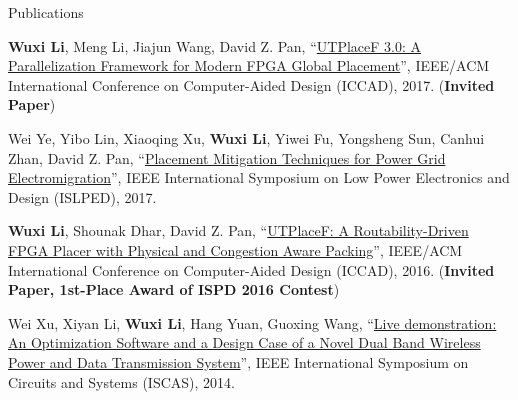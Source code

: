 \begin{rSection}{Publications}
\begin{description}[font=\normalfont]
\item[{[C4]}]{
    \textbf{Wuxi Li}, Meng Li, Jiajun Wang, David Z. Pan,
    ``\href{https://ieeexplore.ieee.org/abstract/document/8203879/}{UTPlaceF 3.0: A Parallelization Framework for Modern FPGA Global Placement}'',
    IEEE/ACM International Conference on Computer-Aided Design (ICCAD), 2017.
    (\textbf{Invited Paper})
}

\item[{[C3]}]{
    Wei Ye, Yibo Lin, Xiaoqing Xu, \textbf{Wuxi Li}, Yiwei Fu, Yongsheng Sun, Canhui Zhan, David Z. Pan,
    ``\href{http://ieeexplore.ieee.org/document/8009178/}{Placement Mitigation Techniques for Power Grid Electromigration}'',
    IEEE International Symposium on Low Power Electronics and Design (ISLPED), 2017.
}

\item[{[C2]}]{
    \textbf{Wuxi Li}, Shounak Dhar, David Z. Pan,
    ``\href{http://ieeexplore.ieee.org/document/7827643/}{UTPlaceF: A Routability-Driven FPGA Placer with Physical and Congestion Aware Packing}'',
    IEEE/ACM International Conference on Computer-Aided Design (ICCAD), 2016.
    (\textbf{Invited Paper, 1st-Place Award of ISPD 2016 Contest})
}

\item[{[C1]}]{
    Wei Xu, Xiyan Li, \textbf{Wuxi Li}, Hang Yuan, Guoxing Wang,
    ``\href{http://ieeexplore.ieee.org/document/6865159/}{Live demonstration: An Optimization Software and a Design Case of a Novel Dual Band Wireless Power and Data Transmission System}'',
    IEEE International Symposium on Circuits and Systems (ISCAS), 2014.
}

\end{description}

\end{rSection}
